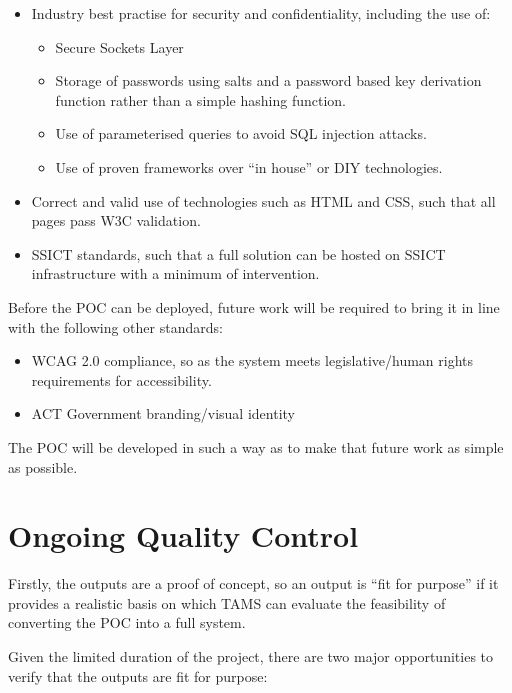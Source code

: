 \documentclass[12pt,a4paper,twosided]{article}
\begin{document}
\begin{itemize}
\itemsep1pt\parskip0pt
\item
  Industry best practise for security and confidentiality, including the
  use of:

  \begin{itemize}
  \itemsep1pt\parskip0pt
  \item
    Secure Sockets Layer
  \item
    Storage of passwords using salts and a password based key derivation
    function rather than a simple hashing function.
  \item
    Use of parameterised queries to avoid SQL injection attacks.
  \item
    Use of proven frameworks over ``in house'' or DIY technologies.
  \end{itemize}
\item
  Correct and valid use of technologies such as HTML and CSS, such that
  all pages pass W3C validation.
\item
  SSICT standards, such that a full solution can be hosted on SSICT
  infrastructure with a minimum of intervention.
\end{itemize}

Before the POC can be deployed, future work will be required to bring it
in line with the following other standards:

\begin{itemize}
\itemsep1pt\parskip0pt
\item
  WCAG 2.0 compliance, so as the system meets legislative/human rights
  requirements for accessibility.
\item
  ACT Government branding/visual identity
\end{itemize}

The POC will be developed in such a way as to make that future work as
simple as possible.

\section{Ongoing Quality Control}

Firstly, the outputs are a proof of concept, so an output is ``fit for
purpose'' if it provides a realistic basis on which TAMS can evaluate
the feasibility of converting the POC into a full system.

Given the limited duration of the project, there are two major
opportunities to verify that the outputs are fit for purpose:
\end{document}
